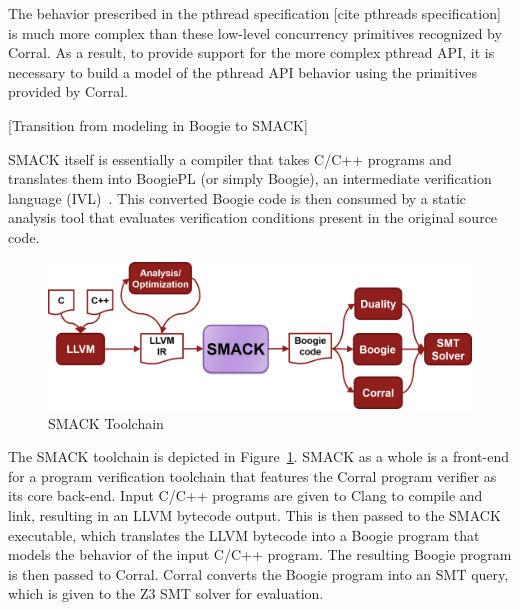 The behavior prescribed in the pthread specification [cite pthreads specification] is much more complex than these low-level concurrency primitives recognized by Corral.  As a result, to provide support for the more complex pthread API, it is necessary to build a model of the pthread API behavior using the primitives provided by Corral.

[Transition from modeling in Boogie to SMACK]

SMACK itself is essentially a compiler that takes C/C++ programs and translates them into BoogiePL (or simply Boogie), an intermediate verification language (IVL)~\cite{smack}.  This converted Boogie code is then consumed by a static analysis tool that evaluates verification conditions present in the original source code.

\begin{figure}[!h]
  \includegraphics[width=1\textwidth]{SmackToolchain.png} 
  \caption{SMACK Toolchain}
  \label{fig:SMACKToolchain}
\end{figure}

The SMACK toolchain is depicted in Figure~\ref{fig:SMACKToolchain}.  SMACK as a whole is a front-end for a program verification toolchain that features the Corral program verifier as its core back-end.  Input C/C++ programs are given to Clang to compile and link, resulting in an LLVM bytecode output.  This is then passed to the SMACK executable, which translates the LLVM bytecode into a Boogie program that models the behavior of the input C/C++ program.  The resulting Boogie program is then passed to Corral.  Corral converts the Boogie program into an SMT query, which is given to the Z3 SMT solver for evaluation.



